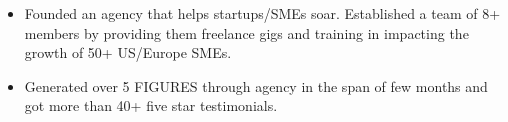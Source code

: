 






\begin{itemize}
    \item Founded an agency that helps startups/SMEs soar. Established a team of 8+ members by providing them freelance gigs and training in impacting the growth of 50+ US/Europe SMEs.
    \item Generated over 5 FIGURES through agency in the span of few months and got more than 40+ five star testimonials.
\end{itemize}

